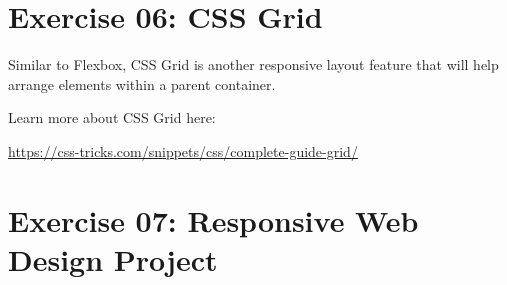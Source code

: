 \documentclass{42-en}
\begin{document}
\chapter{Exercise 06: CSS Grid}

\exnumber{\exercicenumber}

\makeheaderfiles

Similar to Flexbox, CSS Grid is another responsive layout feature that will help arrange elements within a parent container.\par
\vspace{.2in}
Learn more about CSS Grid here: \par
\url{https://css-tricks.com/snippets/css/complete-guide-grid/}


\chapter{Exercise 07: Responsive Web Design Project}

\exnumber{\exercicenumber}

\makeheaderfiles
\end{document}
